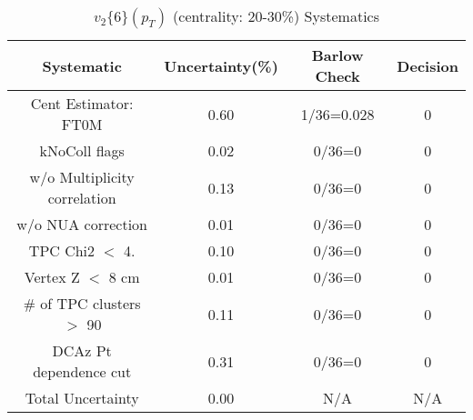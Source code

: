 \begin{table}[htbp]
\caption{$v_2\{6\}(p_{T})$ (centrality: 20-30\%) Systematics}
\label{tab:Sys_pTDiffv26ChFull}
\centering
\begin{tabular}{|c|c|c|c|}
\hline
Systematic & Uncertainty(\%) & Barlow Check & Decision \\
\hline
Cent Estimator: FT0M & 0.60 & 1/36=0.028 & 0 \\
kNoColl flags & 0.02 & 0/36=0 & 0 \\
w/o Multiplicity correlation & 0.13 & 0/36=0 & 0 \\
w/o NUA correction & 0.01 & 0/36=0 & 0 \\
TPC Chi2 $<$ 4. & 0.10 & 0/36=0 & 0 \\
Vertex Z $<$ 8 cm & 0.01 & 0/36=0 & 0 \\
\# of TPC clusters $>$ 90 & 0.11 & 0/36=0 & 0 \\
DCAz Pt dependence cut & 0.31 & 0/36=0 & 0 \\
\hline
Total Uncertainty & 0.00 & N/A & N/A \\
\hline
\end{tabular}
\end{table}
